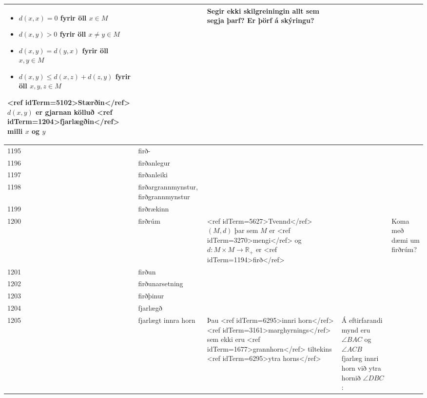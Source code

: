 \begin{longtable}{p{}|p{}|p{}|p{}|p{}}
\begin{itemize}
    \item $d(x,x)=0$ fyrir öll $x \in M$
    \item $d(x,y)>0$ fyrir öll $x \neq y \in M$
    \item $d(x,y)=d(y,x)$ fyrir öll $x,y \in M$
    \item $d(x,y) \leq d(x,z) + d(z,y)$ fyrir öll $x,y,z \in M$
\end{itemize} <ref idTerm=5102>Stærðin</ref> $d(x,y)$ er gjarnan kölluð <ref idTerm=1204>fjarlægðin</ref> milli $x$ og $y$ &  & Segir ekki skilgreiningin allt sem segja þarf? Er þörf á skýringu? \\
\hline
1195 & firð- &  &  &  \\
\hline
1196 & firðanlegur &  &  &  \\
\hline
1197 & firðanleiki &  &  &  \\
\hline
1198 & firðargrannmynstur, firðgrannmynstur &  &  &  \\
\hline
1199 & firðrækinn &  &  &  \\
\hline
1200 & firðrúm & <ref idTerm=5627>Tvennd</ref> $(M,d)$ þar sem $M$ er <ref idTerm=3270>mengi</ref> og $d:M \times M \to \mathbb{R}_+$ er <ref idTerm=1194>firð</ref> &  & Koma með dæmi um firðrúm? \\
\hline
1201 & firðun &  &  &  \\
\hline
1202 & firðunarsetning &  &  &  \\
\hline
1203 & firðþinur &  &  &  \\
\hline
1204 & fjarlægð &  &  &  \\
\hline
1205 & fjarlægt innra horn & Þau <ref idTerm=6295>innri horn</ref> <ref idTerm=3161>marghyrnings</ref> sem ekki eru <ref idTerm=1677>grannhorn</ref> tiltekins <ref idTerm=6295>ytra horns</ref> & Á eftirfarandi mynd eru $\angle BAC$ og $\angle ACB$ fjarlæg innri horn við ytra hornið $\angle DBC$:


\end{longtable}
